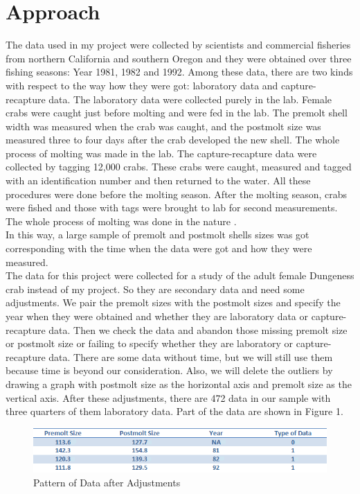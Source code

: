 \documentclass[12pt,letterpaper]{article}
\theoremstyle{definition}
\begin{document}
\section{Approach}
The data used in my project were collected by scientists and commercial fisheries from northern California and southern Oregon and they were obtained over three fishing seasons: Year 1981, 1982 and 1992. Among these data, there are two kinds with respect to the way how they were got: laboratory data and capture-recapture data. The laboratory data were collected purely in the lab. Female crabs were caught just before molting and were fed in the lab. The premolt shell width was measured when the crab was caught, and the postmolt size was measured three to four days after the crab developed the new shell. The whole process of molting was made in the lab. The capture-recapture data were collected by tagging 12,000 crabs. These crabs were caught, measured and tagged with an identification number and then returned to the water. All these procedures were done before the molting season. After the molting season, crabs were fished and those with tags were brought to lab for second measurements. The whole process of molting was done in the nature \cite{deb}.\\
In this way, a large sample of premolt and postmolt shells sizes was got corresponding with the time when the data were got and how they were measured.\\
The data for this project were collected for a study of the adult female Dungeness crab instead of my project. So they are secondary data and need some adjustments. We pair the premolt sizes with the postmolt sizes and specify the year when they were obtained and whether they are laboratory data or capture-recapture data. Then we check the data and abandon those missing premolt size or postmolt size or failing to specify whether they are laboratory or capture-recapture data. There are some data without time, but we will still use them because time is beyond our consideration. Also, we will delete the outliers by drawing a graph with postmolt size as the horizontal axis and premolt size as the vertical axis. After these adjustments, there are 472 data in our sample with three quarters of them laboratory data. Part of the data are shown in Figure 1.\\

\begin{figure}[!htb]
    \begin{center}
        \includegraphics[width=\textwidth]{data.png}
    \end{center}
    \caption{Pattern of Data after Adjustments}
\end{figure}
\end{document}
